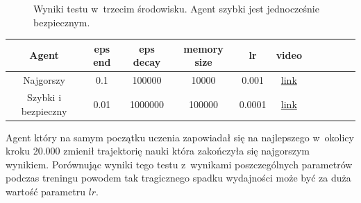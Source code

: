 \documentclass[12pt, oneside]{article}
\begin{document}
\begin{figure}[h]
    \caption{Wyniki testu w~trzecim środowisku. Agent szybki jest jednocześnie bezpiecznym.}
\end{figure}

\begin{center}
\begin{tabular}{ |c|c|c|c|c|c|c|c|c|c|c| } 
\hline
Agent & eps end & eps decay & memory size & lr & video\\
\hline
Najgorszy & 0.1 & 100000 & 10000 & 0.001 & \href{https://youtu.be/6BRF0TOQBJI}{link}\\
Szybki i bezpieczny & 0.01 & 1000000 & 100000 & 0.0001& \href{https://youtu.be/HJj2oh6j5uk}{link}\\
\hline
\end{tabular}
\end{center}
Agent który na samym początku uczenia zapowiadał się na najlepszego w~okolicy kroku 20.000 zmienił trajektorię nauki która zakończyła się najgorszym wynikiem. Porównując wyniki tego testu z~wynikami poszczególnych parametrów podczas treningu powodem tak tragicznego spadku wydajności może być za duża wartość parametru $lr$.
\newpage

\end{document}
